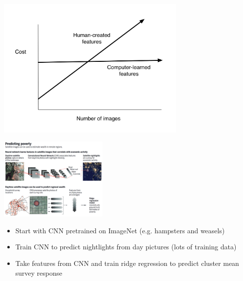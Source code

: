 \documentclass[aspectratio=169]{beamer}
\begin{document}
\begin{frame}

\begin{center}
\includegraphics[width=0.7\textwidth]{figures/zero_variable_cost_features}
\end{center}

\end{frame}
\begin{frame}

\begin{center}
\includegraphics[width=0.4\textwidth]{figures/blumenstock_fighting_2016_fig}
\end{center}

\begin{itemize}
\item Start with CNN pretrained on ImageNet (e.g. hampsters and weasels)
\item Train CNN to predict nightlights from day pictures (lots of training data)
\item Take features from CNN and train ridge regression to predict cluster mean survey response
\end{itemize}

\end{frame}
\end{document}
